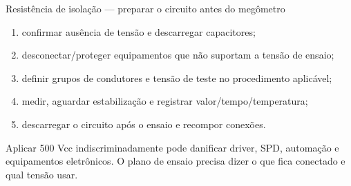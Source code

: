 \begin{frame}{Resistência de isolação — preparar o circuito antes do megômetro}
\scriptsize
\centering
{}
\vspace{0.5mm}
\begin{enumerate}
\item confirmar ausência de tensão e descarregar capacitores;
\item desconectar/proteger equipamentos que não suportam a tensão de ensaio;
\item definir grupos de condutores e tensão de teste no procedimento aplicável;
\item medir, aguardar estabilização e registrar valor/tempo/temperatura;
\item descarregar o circuito após o ensaio e recompor conexões.
\end{enumerate}
\begin{caixaAt}
Aplicar 500 Vcc indiscriminadamente pode danificar driver, SPD, automação e equipamentos eletrônicos. O plano de ensaio precisa dizer o que fica conectado e qual tensão usar.
\end{caixaAt}
\end{frame}

